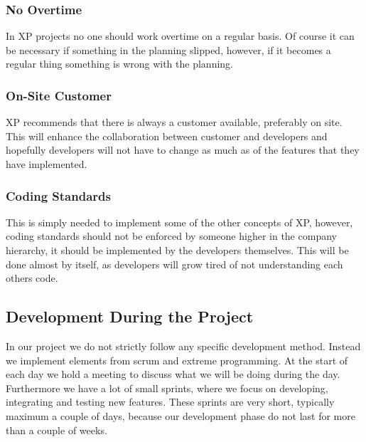 \subsubsection{No Overtime}
In XP projects no one should work overtime on a regular basis.
Of course it can be necessary if something in the planning slipped, however, if it becomes a regular thing something is wrong with the planning.

\subsubsection{On-Site Customer}
XP recommends that there is always a customer available, preferably on site.
This will enhance the collaboration between customer and developers and hopefully developers will not have to change as much as of the features that they have implemented.

\subsubsection{Coding Standards}
This is simply needed to implement some of the other concepts of XP, however, coding standards should not be enforced by someone higher in the company hierarchy, it should be implemented by the developers themselves.
This will be done almost by itself, as developers will grow tired of not understanding each others code.


\subsection{Development During the Project}
\label{sub:ourDevMethod}
In our project we do not strictly follow any specific development method. Instead we implement elements from scrum and extreme programming. At the start of each day we hold a meeting to discuss what we will be doing during the day. Furthermore we have a lot of small sprints, where we focus on developing, integrating and testing new features. These sprints are very short, typically maximum a couple of days, because our development phase do not last for more than a couple of weeks.

